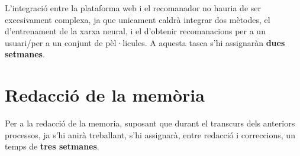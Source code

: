 L'integració entre la plataforma web i el recomanador no hauria de ser excesivament complexa, ja que unicament caldrà integrar dos mètodes, el d'entrenament de la xarxa neural, i el d'obtenir recomanacions per a un usuari/per a un conjunt de pèl·licules. A aquesta tasca s'hi assignaràn \textbf{dues setmanes}.

\section{Redacció de la memòria}

Per a la redacció de la memoria, suposant que durant el transcurs dels anteriors processos, ja s'hi anirà treballant, s'hi assignarà, entre redacció i correccions, un temps de \textbf{tres setmanes}.
